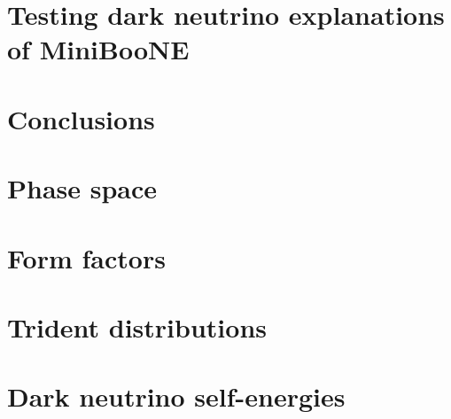 \documentclass[openany,twoside,frontopenright,chaprunninghead]{ip3thesis}
\begin{document}
\chapter{Testing dark neutrino explanations of MiniBooNE }


%

\chapter{Conclusions}


\begin{appendices}
\chapter{Phase space}\label{app:phase_space}


\chapter{Form factors}\label{app:formfactors}


\chapter{Trident distributions}\label{app:trident_distributions}


% 

\chapter{Dark neutrino self-energies}\label{app:loop_masses}

\end{appendices}



\end{document}
